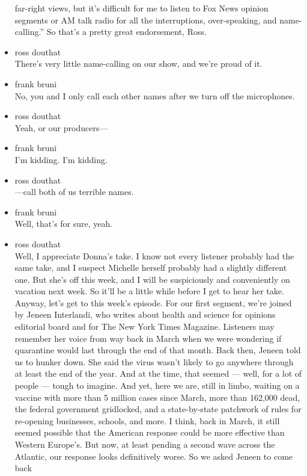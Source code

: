 \begin{itemize}
  far-right views, but it's difficult for me to listen to Fox News
  opinion segments or AM talk radio for all the interruptions,
  over-speaking, and name-calling.'' So that's a pretty great
  endorsement, Ross.
\item
  ross douthat\\
  There's very little name-calling on our show, and we're proud of it.
\item
  frank bruni\\
  No, you and I only call each other names after we turn off the
  microphones.
\item
  ross douthat\\
  Yeah, or our producers---
\item
  frank bruni\\
  I'm kidding. I'm kidding.
\item
  ross douthat\\
  ---call both of us terrible names.
\item
  frank bruni\\
  Well, that's for sure, yeah.
\item
  ross douthat\\
  Well, I appreciate Donna's take. I know not every listener probably
  had the same take, and I suspect Michelle herself probably had a
  slightly different one. But she's off this week, and I will be
  suspiciously and conveniently on vacation next week. So it'll be a
  little while before I get to hear her take. Anyway, let's get to this
  week's episode. For our first segment, we're joined by Jeneen
  Interlandi, who writes about health and science for opinions editorial
  board and for The New York Times Magazine. Listeners may remember her
  voice from way back in March when we were wondering if quarantine
  would last through the end of that month. Back then, Jeneen told us to
  hunker down. She said the virus wasn't likely to go anywhere through
  at least the end of the year. And at the time, that seemed --- well,
  for a lot of people --- tough to imagine. And yet, here we are, still
  in limbo, waiting on a vaccine with more than 5 million cases since
  March, more than 162,000 dead, the federal government gridlocked, and
  a state-by-state patchwork of rules for re-opening businesses,
  schools, and more. I think, back in March, it still seemed possible
  that the American response could be more effective than Western
  Europe's. But now, at least pending a second wave across the Atlantic,
  our response looks definitively worse. So we asked Jeneen to come back

\end{itemize}
